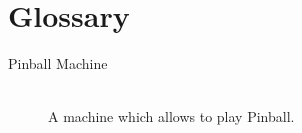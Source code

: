 \documentclass[fontsize=12pt,
               paper=a4,
               twoside=false,
               parskip=half,
               ]{scrartcl}
\begin{document}
\newcommand{\doctitle}{Glossary}


\section*{Glossary}

\begin{description}


\item[Pinball Machine] \hfill \\
A machine which allows to play Pinball.

\end{description}
\end{document}
